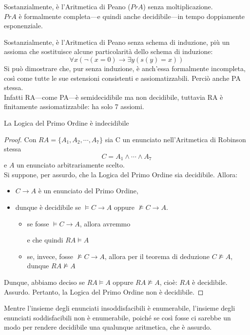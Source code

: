 \begin{defi}
        Sostanzialmente, è l'Aritmetica di Peano ($PrA$) senza moltiplicazione. \\
        $PrA$ è formalmente completa—e quindi anche decidibile—in tempo doppiamente esponenziale.
\end{defi}

\begin{defi}
  Sostanzialmente, è l'Aritmetica di Peano senza schema di induzione, più un assioma che sostituisce alcune particolarità dello schema di induzione:
  $$
  \forall x (\neg (x= 0) \rightarrow \exists y (s(y) = x))
  $$
  Si può dimostrare che, pur senza induzione, è anch'essa formalmente incompleta, così come tutte le sue estensioni consistenti e assiomatizzabili. Perciò anche PA stessa. \\
  Infatti RA—come PA—è semidecidibile ma non decidibile, tuttavia RA è finitamente assiomatizzabile: ha solo 7 assiomi.
\end{defi}

\begin{teo}
  La Logica del Primo Ordine è indecidibile
\end{teo}
\begin{proof}
  Con $RA = \{A_1, A_2, \cdots, A_7\}$ sia C un enunciato nell'Aritmetica di Robinson stessa
  $$
  C = A_1 \land \cdots \land A_7
  $$
  e $A$ un enunciato arbitrariamente scelto. \\
  Si suppone, per assurdo, che la Logica del Primo Ordine sia decidibile. Allora:
  \begin{itemize}
    \item $C \rightarrow A$ è un enunciato del Primo Ordine, 
    \item dunque è decidibile se $\models C \rightarrow A$ oppure $\nvDash C \rightarrow A$. 
      \begin{itemize}
        \item se fosse $\models C\rightarrow A$, allora avremmo 
          \begin{prooftree}
          \end{prooftree}
          e che quindi $RA \models A$
        \item se, invece, fosse $\nvDash C \rightarrow A$, allora per il teorema di deduzione $C \nvDash A$, dunque $RA \nvDash A$
      \end{itemize}
  \end{itemize}
  Dunque, abbiamo deciso se $RA \models A$ oppure $RA \nvDash A$, cioè: $RA$ è decidibile. \\ Assurdo. Pertanto, la Logica del Primo Ordine non è decidibile.
\end{proof}

Mentre l'insieme degli enunciati insoddisfacibili è enumerabile, l'insieme degli enunciati soddisfacibili non è enumerabile, poiché se così fosse ci sarebbe un modo per rendere decidibile una qualunque aritmetica, che è assurdo.